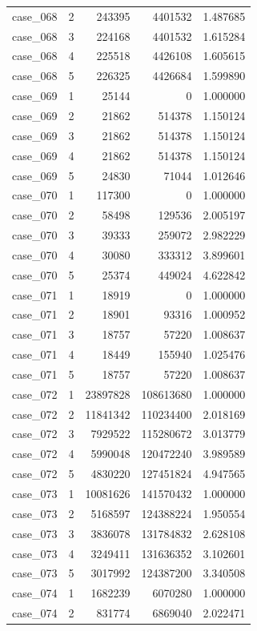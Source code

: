 \begin{longtable}{lrrrr}
case\_068 & 2 & 243395 & 4401532 & 1.487685 \\
case\_068 & 3 & 224168 & 4401532 & 1.615284 \\
case\_068 & 4 & 225518 & 4426108 & 1.605615 \\
case\_068 & 5 & 226325 & 4426684 & 1.599890 \\
case\_069 & 1 & 25144 & 0 & 1.000000 \\
case\_069 & 2 & 21862 & 514378 & 1.150124 \\
case\_069 & 3 & 21862 & 514378 & 1.150124 \\
case\_069 & 4 & 21862 & 514378 & 1.150124 \\
case\_069 & 5 & 24830 & 71044 & 1.012646 \\
case\_070 & 1 & 117300 & 0 & 1.000000 \\
case\_070 & 2 & 58498 & 129536 & 2.005197 \\
case\_070 & 3 & 39333 & 259072 & 2.982229 \\
case\_070 & 4 & 30080 & 333312 & 3.899601 \\
case\_070 & 5 & 25374 & 449024 & 4.622842 \\
case\_071 & 1 & 18919 & 0 & 1.000000 \\
case\_071 & 2 & 18901 & 93316 & 1.000952 \\
case\_071 & 3 & 18757 & 57220 & 1.008637 \\
case\_071 & 4 & 18449 & 155940 & 1.025476 \\
case\_071 & 5 & 18757 & 57220 & 1.008637 \\
case\_072 & 1 & 23897828 & 108613680 & 1.000000 \\
case\_072 & 2 & 11841342 & 110234400 & 2.018169 \\
case\_072 & 3 & 7929522 & 115280672 & 3.013779 \\
case\_072 & 4 & 5990048 & 120472240 & 3.989589 \\
case\_072 & 5 & 4830220 & 127451824 & 4.947565 \\
case\_073 & 1 & 10081626 & 141570432 & 1.000000 \\
case\_073 & 2 & 5168597 & 124388224 & 1.950554 \\
case\_073 & 3 & 3836078 & 131784832 & 2.628108 \\
case\_073 & 4 & 3249411 & 131636352 & 3.102601 \\
case\_073 & 5 & 3017992 & 124387200 & 3.340508 \\
case\_074 & 1 & 1682239 & 6070280 & 1.000000 \\
case\_074 & 2 & 831774 & 6869040 & 2.022471 \\

\end{longtable}
